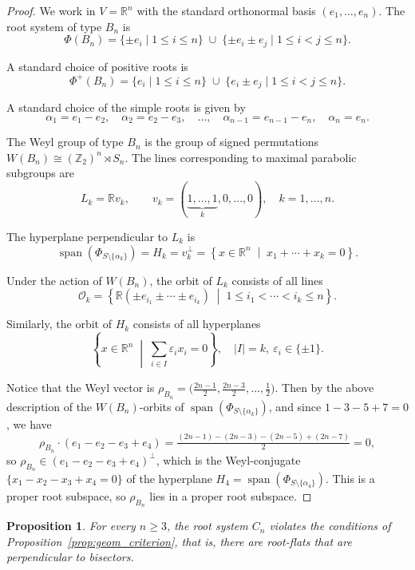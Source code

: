 \documentclass[11pt]{amsart}
\DeclareMathOperator{\Span}{span}
\theoremstyle{plain}
\newtheorem{prop}[thm]{Proposition}
\theoremstyle{definition}
\theoremstyle{remark}
\begin{document}
	\begin{proof}
		We work in $V = \mathbb{R}^n$ with the standard orthonormal basis $(e_1,\dots,e_n)$. The root system of type $B_n$ is
		\[
		\Phi(B_n)
		=
		\{ \pm e_i \mid 1 \le i \le n \}
		\;\cup\;
		\{ \pm e_i \pm e_j \mid 1 \le i < j \le n \}.
		\]
		
		A standard choice of positive roots is
		\[
		\Phi^+(B_n)
		=
		\{ e_i \mid 1 \le i \le n \}
		\;\cup\;
		\{ e_i \pm e_j \mid 1 \le i < j \le n \}.
		\]
		
		A standard choice of the simple roots is given by
		\[
		\alpha_1 = e_1 - e_2,\quad
		\alpha_2 = e_2 - e_3,\quad \dots,\quad
		\alpha_{n-1} = e_{n-1} - e_n,\quad
		\alpha_n = e_n.
		\]
		
		The Weyl group of type $B_n$ is the group of signed permutations $
		W(B_n) \cong (\mathbb{Z}_2)^n \rtimes S_n$.  The lines corresponding to maximal parabolic subgroups are
		\[
		L_k = \mathbb{R}v_k, \qquad
		v_k = (\underbrace{1,\dots,1}_{k},0,\dots,0),
		\quad k=1,\dots,n.
		\]
		
		The hyperplane perpendicular to $L_k$ is
		\[
		\Span(\Phi_{S\setminus\{\alpha_k\}}) = H_k = v_k^\perp
		=
		\left\{ x \in \mathbb{R}^n \;\middle|\; x_1 + \cdots + x_k = 0 \right\}.
		\]
		
		Under the action of $W(B_n)$, the orbit of $L_k$ consists of all lines
		\[
		\mathcal{O}_k
		=
		\left\{
		\mathbb{R}(\pm e_{i_1} \pm \cdots \pm e_{i_k})
		\;\middle|\;
		1 \le i_1 < \cdots < i_k \le n
		\right\}.
		\]
		
		Similarly, the orbit of $H_k$ consists of all hyperplanes
		\[
		\left\{
		x \in \mathbb{R}^n \;\middle|\;
		\sum_{i \in I} \varepsilon_i x_i = 0
		\right\},
		\quad |I| = k,\ \varepsilon_i \in \{\pm 1\}.
		\]
		
		Notice that the Weyl vector is $\rho_{B_n}=\bigl(\tfrac{2n-1}{2},\tfrac{2n-3}{2},\dots,\tfrac12\bigr)$. Then by the above description of the $W(B_n)$-orbits of $\Span(\Phi_{S\setminus\{\alpha_k\}})$, and since $1-3-5+7=0$, we have
		\[
		\rho_{B_n}\cdot(e_1-e_2-e_3+e_4)
		= \tfrac{(2n-1)-(2n-3)-(2n-5)+(2n-7)}{2}=0,
		\]
		so $\rho_{B_n}\in (e_1-e_2-e_3+e_4)^\perp$, which is the Weyl-conjugate $\{x_1-x_2-x_3+x_4=0\}$ of the hyperplane $H_4=\Span(\Phi_{S\setminus\{\alpha_4\}})$. This is a proper root subspace, so $\rho_{B_n}$ lies in a proper root subspace.
	\end{proof}
	
	\begin{prop}
		\label{prop:Cn} 
		For every $n\ge 3$, the root system $C_n$ violates the conditions of Proposition~\ref{prop:geom_criterion}, that is, there are root-flats that are perpendicular to bisectors.
	\end{prop}
	
\end{document}
